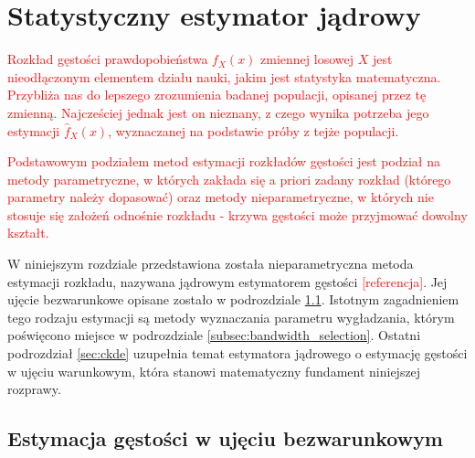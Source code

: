 \chapter{Statystyczny estymator jądrowy} \label{chap:kde}

\textcolor{red}{Rozkład gęstości prawdopobieństwa $f_X(x)$ zmiennej losowej $X$ jest nieodłączonym elementem działu nauki, jakim jest statystyka matematyczna. Przybliża nas do lepszego zrozumienia badanej populacji, opisanej przez tę zmienną. Najcześciej jednak jest on nieznany, z czego wynika potrzeba jego estymacji $\hat{f}_X(x)$, wyznaczanej na podstawie próby z tejże populacji.}

\textcolor{red}{Podstawowym podziałem metod estymacji rozkładów gęstości jest podział na metody parametryczne, w których zakłada się a priori zadany rozkład (którego parametry należy dopasować) oraz metody nieparametryczne, w których nie stosuje się założeń odnośnie rozkładu - krzywa gęstości może przyjmować dowolny kształt.}

W niniejszym rozdziale przedstawiona została nieparametryczna metoda estymacji rozkładu, nazywana jądrowym estymatorem gęstości \textcolor{red}{[referencja]}. Jej ujęcie bezwarunkowe opisane zostało w podrozdziale \ref{sec:kde}. Istotnym zagadnieniem tego rodzaju estymacji są metody wyznaczania parametru wygładzania, którym poświęcono miejsce w podrozdziale \ref{subsec:bandwidth_selection}. Ostatni podrozdział \ref{sec:ckde} uzupełnia temat estymatora jądrowego o estymację gęstości w ujęciu warunkowym, która stanowi matematyczny fundament niniejszej rozprawy.

\section{Estymacja gęstości w ujęciu bezwarunkowym} \label{sec:kde}

